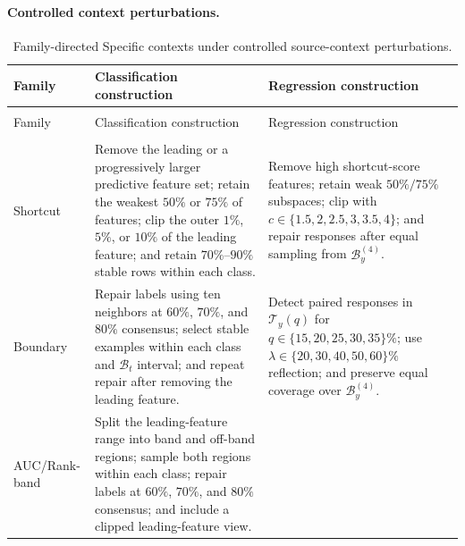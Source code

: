 \paragraph{Controlled context perturbations.}
\begingroup
  \footnotesize
  \setlength{\LTpre}{0.45\baselineskip}
  \setlength{\LTpost}{0.45\baselineskip}
  \begin{longtable}{@{}>{\raggedright\arraybackslash}p{}
                      >{\raggedright\arraybackslash}p{}
                      >{\raggedright\arraybackslash}p{}@{}}
    \caption{Family-directed Specific contexts under controlled source-context
    perturbations.}
    \label{tab:specific-perturbation-contexts} \\
    \toprule
    Family & Classification construction & Regression construction \\
    \midrule
    \endfirsthead
    \multicolumn{3}{@{}l}{\tablename~\thetable\ (continued)} \\
    \toprule
    Family & Classification construction & Regression construction \\
    \midrule
    \endhead
    \midrule
    \multicolumn{3}{r@{}}{Continued on next page} \\
    \endfoot
    \bottomrule
    \endlastfoot
    Shortcut
      & Remove the leading or a progressively larger predictive feature set;
        retain the weakest $50\%$ or $75\%$ of features; clip the outer
        $1\%$, $5\%$, or $10\%$ of the leading feature; and retain
        $70\%$--$90\%$ stable
        rows within each class.
      & Remove high shortcut-score features; retain weak $50\%/75\%$
        subspaces; clip with $c\in\{1.5,2,2.5,3,3.5,4\}$; and repair responses after equal
        sampling from $\mathcal B_y^{(4)}$. \\
    Boundary
      & Repair labels using ten neighbors at $60\%$, $70\%$, and $80\%$
        consensus; select stable examples within each class and
        $\mathcal B_t$ interval; and repeat repair after removing the leading
        feature.
      & Detect paired responses in $\mathcal T_y(q)$ for
        $q\in\{15,20,25,30,35\}\%$; use
        $\lambda\in\{20,30,40,50,60\}\%$ reflection;
        and preserve equal coverage over $\mathcal B_y^{(4)}$. \\
    AUC/\newline Rank-band
      & Split the leading-feature range into band and off-band regions; sample
        both regions within each class; repair labels at $60\%$, $70\%$, and
        $80\%$ consensus; and include a clipped leading-feature view.

\end{longtable}
